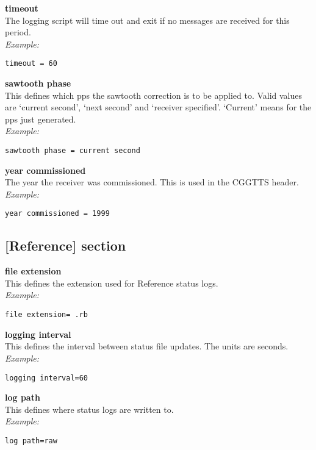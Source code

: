 {\bfseries timeout}\\
The logging script will time out and exit if no messages are received for this period.\\
\textit{Example:}
\begin{lstlisting}
timeout = 60
\end{lstlisting}

{\bfseries sawtooth phase}\\
This defines which pps the sawtooth correction is to be applied to.
Valid values are `current second', `next second' and `receiver specified'.
`Current' means for the pps just generated.\\
\textit{Example:}
\begin{lstlisting}
sawtooth phase = current second
\end{lstlisting}

{\bfseries year commissioned}\\
The year the receiver was commissioned. This is used in the CGGTTS header.\\
\textit{Example:}
\begin{lstlisting}
year commissioned = 1999
\end{lstlisting}

\subsection{[Reference] section}

\hypertarget{h:reference}{}

{\bfseries file extension}\\
This defines the extension used for Reference status logs.\\
\textit{Example:}
\begin{lstlisting}
file extension= .rb
\end{lstlisting}

{\bfseries logging interval}\\
This defines the interval between status file updates. The units are seconds.\\
\textit{Example:}
\begin{lstlisting}
logging interval=60
\end{lstlisting}

{\bfseries log path}\\
This defines where status logs are written to.\\
\textit{Example:}
\begin{lstlisting}
log path=raw
\end{lstlisting}

